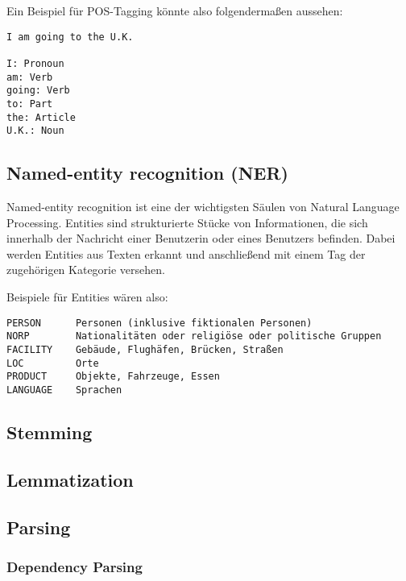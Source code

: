 Ein Beispiel für POS-Tagging könnte also folgendermaßen aussehen:

\begin{lstlisting}[label={lst: POS-Tagging}]
I am going to the U.K.

I: Pronoun
am: Verb
going: Verb
to: Part
the: Article
U.K.: Noun
\end{lstlisting}

\subsection{Named-entity recognition (NER)}

Named-entity recognition ist eine der wichtigsten Säulen von Natural Language Processing.
Entities sind strukturierte Stücke von Informationen, die sich innerhalb der Nachricht einer Benutzerin oder eines Benutzers befinden.
Dabei werden Entities aus Texten erkannt und anschließend mit einem Tag der zugehörigen Kategorie versehen.\cite{namedEntityRecognition}

Beispiele für Entities wären also:

\begin{lstlisting}[label={lst: NER-Tagging}]
PERSON      Personen (inklusive fiktionalen Personen)
NORP        Nationalitäten oder religiöse oder politische Gruppen
FACILITY    Gebäude, Flughäfen, Brücken, Straßen
LOC         Orte
PRODUCT     Objekte, Fahrzeuge, Essen
LANGUAGE    Sprachen
\end{lstlisting}

\subsection{Stemming}


\subsection{Lemmatization}


\subsection{Parsing}


\subsubsection{Dependency Parsing}


